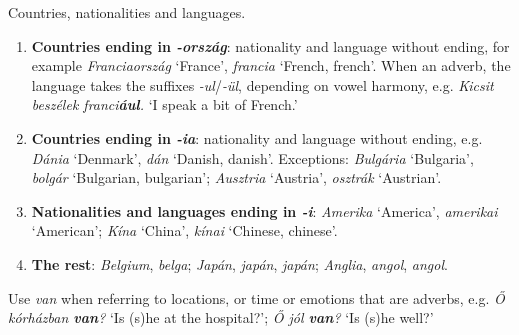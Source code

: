 \documentclass[a4paper,11pt]{article}
\begin{document}
\noindent Countries, nationalities and languages.
\begin{enumerate}

  \item \textbf{Countries ending in \emph{-ország}}: nationality and
    language without ending, for example \emph{Franciaország}
    `France', \emph{francia} `French, french'. When an adverb, the
    language takes the suffixes \emph{-ul}/\emph{-ül}, depending on
    vowel harmony, e.g. \emph{Kicsit beszélek franci\textbf{ául}.} `I
    speak a bit of French.'

  \item \textbf{Countries ending in \emph{-ia}}: nationality and
    language without ending, e.g. \emph{Dánia} `Denmark', \emph{dán}
    `Danish, danish'. Exceptions: \emph{Bulgária} `Bulgaria',
    \emph{bolgár} `Bulgarian, bulgarian'; \emph{Ausztria} `Austria',
    \emph{osztrák} `Austrian'.

  \item \textbf{Nationalities and languages ending in \emph{-i}}:
    \emph{Amerika} `America', \emph{amerika\emph{i}} `American';
    \emph{Kína} `China', \emph{kína\emph{i}} `Chinese, chinese'.

  \item \textbf{The rest}: \emph{Belgium}, \emph{belga}; \emph{Japán},
    \emph{japán}, \emph{japán}; \emph{Anglia}, \emph{angol},
    \emph{angol}.

\end{enumerate}

\noindent Use \emph{van} when referring to locations, or time or
emotions that are adverbs, e.g. \emph{Ő kórházban \textbf{van}?} `Is
(s)he at the hospital?'; \emph{Ő jól \textbf{van}?} `Is (s)he well?'
\end{document}
